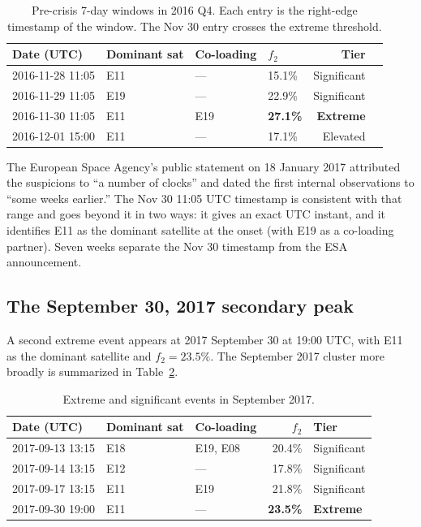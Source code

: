 \documentclass[11pt,a4paper]{article}
\begin{document}
\begin{table}[h]
    \centering
    \caption{Pre-crisis 7-day windows in 2016 Q4. Each entry is the right-edge timestamp of the window. The Nov 30 entry crosses the extreme threshold.}
    \label{tab:onset}
    \begin{tabular}{lll lrl}
        \toprule
        Date (UTC) & Dominant sat & Co-loading & $f_2$ & Tier \\
        \midrule
        2016-11-28 11:05 & E11 & --- & 15.1\% & Significant \\
        2016-11-29 11:05 & E19 & --- & 22.9\% & Significant \\
        2016-11-30 11:05 & E11 & E19 & \textbf{27.1\%} & \textbf{Extreme} \\
        2016-12-01 15:00 & E11 & --- & 17.1\% & Elevated \\
        \bottomrule
    \end{tabular}
\end{table}

The European Space Agency's public statement on 18 January 2017 \citep{ESA2017} attributed the suspicions to ``a number of clocks'' and dated the first internal observations to ``some weeks earlier.'' The Nov 30 11:05 UTC timestamp is consistent with that range and goes beyond it in two ways: it gives an exact UTC instant, and it identifies E11 as the dominant satellite at the onset (with E19 as a co-loading partner). Seven weeks separate the Nov 30 timestamp from the ESA announcement.

\subsection{The September 30, 2017 secondary peak}

A second extreme event appears at 2017 September 30 at 19:00 UTC, with E11 as the dominant satellite and $f_2 = 23.5\%$. The September 2017 cluster more broadly is summarized in Table~\ref{tab:sept2017}.

\begin{table}[h]
    \centering
    \caption{Extreme and significant events in September 2017.}
    \label{tab:sept2017}
    \begin{tabular}{lll rl}
        \toprule
        Date (UTC) & Dominant sat & Co-loading & $f_2$ & Tier \\
        \midrule
        2017-09-13 13:15 & E18 & E19, E08 & 20.4\% & Significant \\
        2017-09-14 13:15 & E12 & --- & 17.8\% & Significant \\
        2017-09-17 13:15 & E11 & E19 & 21.8\% & Significant \\
        2017-09-30 19:00 & E11 & --- & \textbf{23.5\%} & \textbf{Extreme} \\
        \bottomrule
    \end{tabular}
\end{table}
\end{document}

